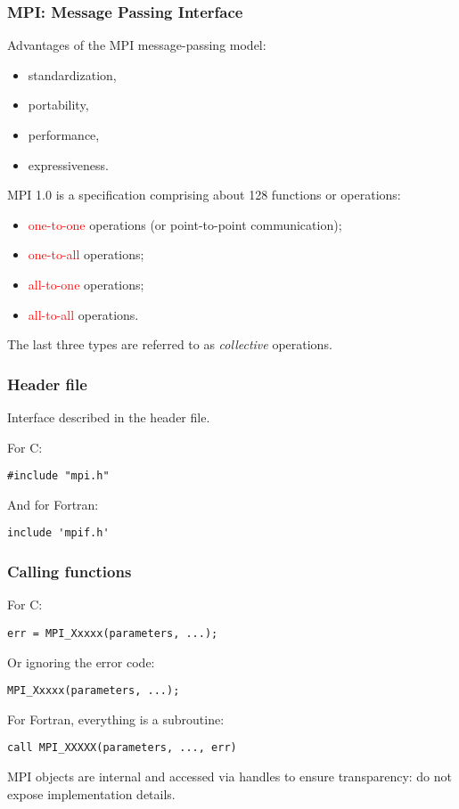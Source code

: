 \begin{frame}
  \frametitle{MPI: Message Passing Interface}
  Advantages of the MPI message-passing model:
  \begin{itemize}
  \item standardization,
  \item portability,
  \item performance,
  \item expressiveness.
  \end{itemize}

  MPI 1.0 is a specification comprising about 128 functions or operations:
  \begin{itemize}
  \item \textcolor{red}{one-to-one} operations (or point-to-point communication);
  \item \textcolor{red}{one-to-all} operations;
  \item \textcolor{red}{all-to-one} operations;
  \item \textcolor{red}{all-to-all} operations.
  \end{itemize}
  The last three types are referred to as {\em collective} operations.
\end{frame}

\begin{frame}[fragile]
  \frametitle{Header file}

\begin{center}
Interface described in the header file.
\end{center}

For C:
\begin{lstlisting}[style=c]
#include "mpi.h"
\end{lstlisting}

  And for Fortran:
\begin{lstlisting}[style=fortran]
include 'mpif.h'
\end{lstlisting}
\end{frame}

\begin{frame}[fragile]
  \frametitle{Calling functions}
  For C:
\begin{lstlisting}[style=c,morekeywords={err}]
err = MPI_Xxxxx(parameters, ...);
\end{lstlisting}
  Or ignoring the error code:
\begin{lstlisting}[style=c,morekeywords={err}]
MPI_Xxxxx(parameters, ...);
\end{lstlisting}

  For Fortran, everything is a subroutine:
\begin{lstlisting}[style=fortran,morekeywords={err}]
call MPI_XXXXX(parameters, ..., err)
\end{lstlisting}

\medskip
MPI objects are internal and accessed via handles to ensure transparency: do not expose implementation details.
\end{frame}

